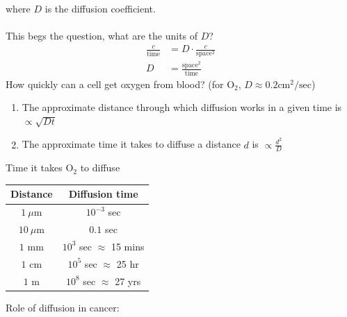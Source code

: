 \documentclass[12pt, letterpaper]{article}
\begin{document}
where $D$ is the diffusion coefficient. \\ \\
This begs the question, what are the units of $D$?
\begin{align*}
    \frac{c}{\text{time}} &= D \cdot \frac{c}{\text{space}^2} \\
    D &= \frac{\text{space}^2}{\text{time}}
\end{align*}
 How quickly can a cell get oxygen from blood? (for O$_2$, $D \approx 0.2 \text{cm}^2/\text{sec}$)
\begin{enumerate}
    \item The approximate distance through which diffusion works in a given time is $\propto \sqrt{Dt}$
    \item The approximate time it takes to diffuse a distance $d$ is $\propto \frac{d^2}{D}$
\end{enumerate}
\begin{center}
    Time it takes O$_2$ to diffuse \\
    \begin{tabular}{c | c}
        \hline 
        Distance & Diffusion time \\
        \hline 
        $1\ \mu$m & $10^{-3}$ sec \\
        $10\ \mu$m & $0.1$ sec \\
        $1$ mm & $10^3$ sec $\approx$ 15 mins \\
        $1$ cm & $10^5$ sec $\approx$ 25 hr \\
        $1$ m & $10^8$ sec $\approx$ 27 yrs \\
    \end{tabular}
\end{center}
Role of diffusion in cancer: 
\end{document}
